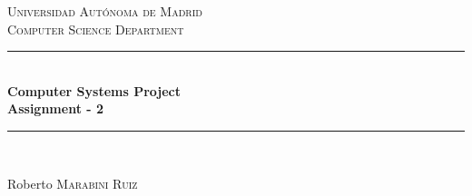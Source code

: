 \documentclass[12pt]{article} %
\begin{document}

\begin{titlepage}

\newcommand{\HRule}{\rule{\linewidth}{0.5mm}} %

\center %

\textsc{\LARGE Universidad Aut\'{o}noma de Madrid}\\[1.5cm] %
\textsc{\Large Computer Science Department}\\[0.5cm] %

\HRule \\[0.4cm]
{ \huge \bfseries Computer Systems Project\\[0.5cm] Assignment - 2}\\[0.4cm] %
\HRule \\[1.5cm]





\vfill %
\begin{flushright}
 \large
Roberto  \textsc{Marabini Ruiz} %
\end{flushright}

\end{titlepage}
\end{document}
